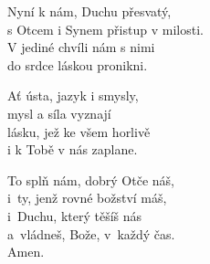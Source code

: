 \begin{translatioMulticol}{3}
Nyní k nám, Duchu přesvatý,\\
s Otcem i Synem přistup v milosti.\\
V jediné chvíli nám s nimi\\
do srdce láskou pronikni.\columnbreak

Ať ústa, jazyk i smysly,\\
mysl a síla vyznají\\
lásku, jež ke všem horlivě\\
i k Tobě v nás zaplane.\columnbreak

To splň nám, dobrý Otče náš,\\
i~ty, jenž rovné božství máš,\\
i~Duchu, který těšíš nás\\
a~vládneš, Bože, v~každý čas.\\
Amen.
\end{translatioMulticol}
